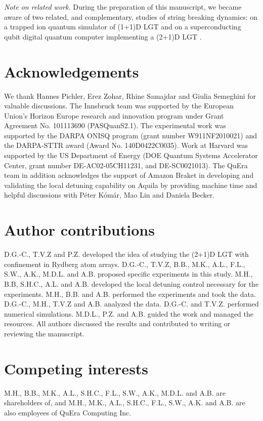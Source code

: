 \documentclass[footinbib,a4paper,aps,superscriptaddress,twocolumn,preprintnumbers,amsmath,amssymb,nobalancelastpage,10pt,prl]{revtex4-2}
\begin{document}
{\em Note on related work.} During the preparation of this manuscript, we became aware of two related, and complementary, studies of string breaking dynamics: on a trapped ion quantum simulator of (1+1)D LGT \cite{De2024} and on a superconducting qubit digital quantum computer implementing a (2+1)D LGT \cite{Google_2024}.

\section*{Acknowledgements}

We thank Hannes Pichler, Erez Zohar, Rhine Samajdar and Giulia Semeghini  for valuable discussions.
The Innsbruck team was supported by the European Union’s Horizon Europe research and innovation program under Grant Agreement No. 101113690 (PASQuanS2.1).  The experimental work was supported by the DARPA ONISQ program (grant number W911NF2010021) and the DARPA-STTR award (Award No. 140D0422C0035). Work at Harvard was supported by the US Department of Energy (DOE Quantum Systems Accelerator Center, grant number DE-AC02-05CH11231, and DE-SC0021013). 
The QuEra team in addition acknowledges the support of Amazon Braket in developing and validating the local detuning capability on Aquila by providing machine time and helpful discussions with P\'eter K\'om\'ar, Mao Lin and Daniela Becker.


\section*{Author contributions}
D.G.-C., T.V.Z and P.Z. developed the idea of studying the (2+1)D LGT with confinement in Rydberg atom arrays. D.G.-C., T.V.Z, B.B., M.K., A.L., F.L., S.W., A.K., M.D.L. and A.B. proposed specific experiments in this study. M.H., B.B, S.H.C., A.L. and A.B. developed the local detuning control necessary for the experiments. M.H., B.B. and A.B. performed the experiments and took the data. D.G.-C., M.H., T.V.Z and A.B. analyzed the data. D.G.-C. and T.V.Z. performed numerical simulations. M.D.L., P.Z. and A.B. guided the work and managed the resources. All authors discussed the results and contributed to writing or reviewing the manuscript.

\section*{Competing interests}
M.H., B.B., M.K., A.L., S.H.C., F.L., S.W., A.K., M.D.L. and A.B. are shareholders of, and M.H., M.K., A.L., S.H.C., F.L., S.W., A.K. and A.B. are also employees of QuEra Computing Inc.
\end{document}
